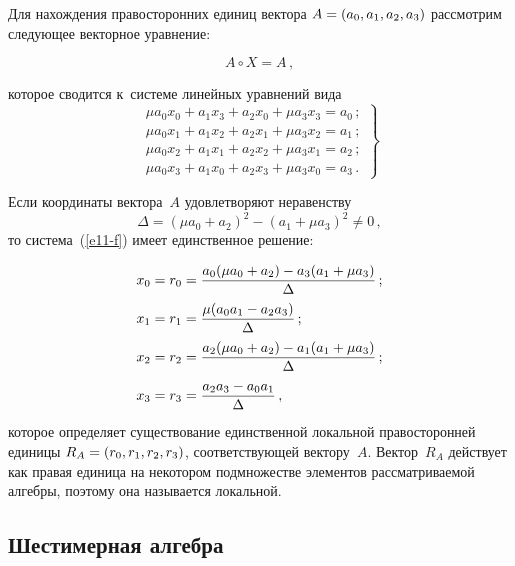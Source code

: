 \begin{multicols}{2}
  Для нахождения правосторонних единиц вектора $A\hm= (a_0, a_1, a_2, a_3)$ 
рассмотрим следующее векторное уравнение:

\vspace*{1pt}

\noindent
  \begin{equation}
  A\circ X=A\,,
  \label{e10-f}
  \end{equation}
  
  \vspace*{-1pt}
  
  \noindent
которое сводится к~системе линейных уравнений вида
\begin{equation}
\left.
\begin{matrix}
\mu a_0 x_0+a_1x_3+a_2x_0+\mu a_3x_3=a_0\,;\\[2pt]
\mu a_0x_1+a_1x_2+a_2x_1+\mu a_3x_2 =a_1\,;\\[2pt]
\mu a_0 x_2+a_1x_1+a_2x_2+\mu a_3 x_1=a_2\,;\\[2pt]
\mu a_0x_3+a_1x_0+a_2x_3+\mu a_3x_0=a_3\,.
\end{matrix}
\right\}
\label{e11-f}
\end{equation}
  
  Если координаты вектора~$A$ удовлетворяют неравенству 
    \begin{equation*}
  \Delta = \left( \mu a_0+a_2\right)^2 -\left( a_1+\mu a_3\right)^2\not= 0\,,
  \end{equation*}
то система~(\ref{e11-f}) имеет единственное решение:

\noindent
\begin{align*}
x_0&=r_0=\displaystyle\frac{\displaystyle a_0(\mu a_0+a_2)-a_3(a_1+\mu a_3)\mathstrut}{\displaystyle \Delta\mathstrut}\,;\\ 
x_1&=r_1=\displaystyle\frac{\displaystyle \mu(a_0a_1-a_2a_3)\mathstrut}{\displaystyle \Delta\mathstrut}\,;\\
x_2&=r_2=\displaystyle\frac{\displaystyle a_2(\mu a_0+a_2)-a_1(a_1+\mu a_3)\mathstrut}{\displaystyle \Delta\mathstrut}\,;\\ 
x_3&=r_3=\displaystyle\frac{\displaystyle a_2 a_3-a_0 a_1\mathstrut}{\displaystyle \Delta\mathstrut}\,,
\end{align*}
которое определяет существование единственной локальной правосторонней 
единицы $R_A\hm= (r_0, r_1, r_2, r_3)$, соответствующей вектору~$A$. 
Вектор~$R_A$ действует как правая единица на \mbox{некотором} подмножестве 
элементов рассматриваемой ал\-геб\-ры, поэтому она называется локальной. 

  \subsection{Шестимерная алгебра}
  

\end{multicols}
